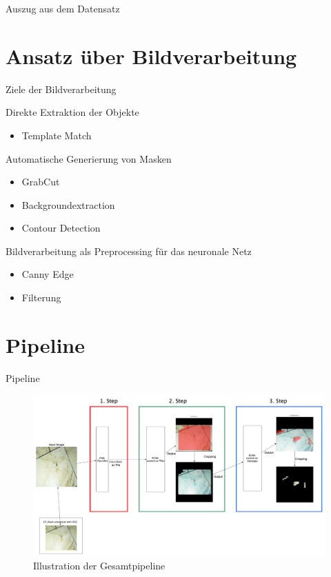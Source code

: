 \documentclass[9pt]{beamer}
\begin{document}
\begin{frame}{Auszug aus dem Datensatz}

\end{frame}

\section{Ansatz über Bildverarbeitung}  
\begin{frame}{Ziele der Bildverarbeitung}
\begin{block}{Direkte Extraktion der Objekte}
	\begin{itemize}
		\item Template Match
	\end{itemize}
\end{block}

\begin{block}{Automatische Generierung von Masken}
	\begin{itemize}
		\item GrabCut
		\item Backgroundextraction
		\item Contour Detection
	\end{itemize}
\end{block}

\begin{block}{Bildverarbeitung als Preprocessing für das neuronale Netz}
	\begin{itemize}
		\item Canny Edge 
		\item Filterung
	\end{itemize}
\end{block}
	
\end{frame}

\section{Pipeline}  	
\begin{frame}{Pipeline}
\begin{figure}
	\includegraphics[width=\textwidth]{./fig/Pipeline.png}
	\caption{Illustration der Gesamtpipeline}
\end{figure}

\end{frame}
\end{document}

